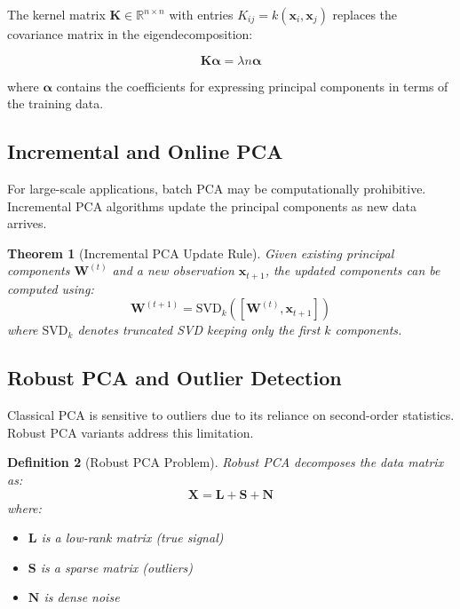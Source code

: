 \documentclass[12pt]{article}
\renewcommand{\vec}[1]{\mathbf{#1}}
\newtheorem{theorem}{Theorem}[section]
\newtheorem{definition}[theorem]{Definition}
\begin{document}
The kernel matrix $\vec{K} \in \mathbb{R}^{n \times n}$ with entries $K_{ij} = k(\vec{x}_i, \vec{x}_j)$ replaces the covariance matrix in the eigendecomposition:

\begin{equation}
    \vec{K}\vec{\alpha} = \lambda n \vec{\alpha}
\end{equation}

where $\vec{\alpha}$ contains the coefficients for expressing principal components in terms of the training data.

\subsection{Incremental and Online PCA}

For large-scale applications, batch PCA may be computationally prohibitive. Incremental PCA algorithms update the principal components as new data arrives.

\begin{theorem}[Incremental PCA Update Rule]
    Given existing principal components $\vec{W}^{(t)}$ and a new observation $\vec{x}_{t+1}$, the updated components can be computed using:
    \begin{equation}
        \vec{W}^{(t+1)} = \text{SVD}_k\left([\vec{W}^{(t)}, \vec{x}_{t+1}]\right)
    \end{equation}
    where $\text{SVD}_k$ denotes truncated SVD keeping only the first $k$ components.
\end{theorem}

\subsection{Robust PCA and Outlier Detection}

Classical PCA is sensitive to outliers due to its reliance on second-order statistics. Robust PCA variants address this limitation.

\begin{definition}[Robust PCA Problem]
    Robust PCA decomposes the data matrix as:
    \begin{equation}
        \vec{X} = \vec{L} + \vec{S} + \vec{N}
    \end{equation}
    where:
    \begin{itemize}[noitemsep]
        \item $\vec{L}$ is a low-rank matrix (true signal)
        \item $\vec{S}$ is a sparse matrix (outliers)
        \item $\vec{N}$ is dense noise
    \end{itemize}
\end{definition}
\end{document}

